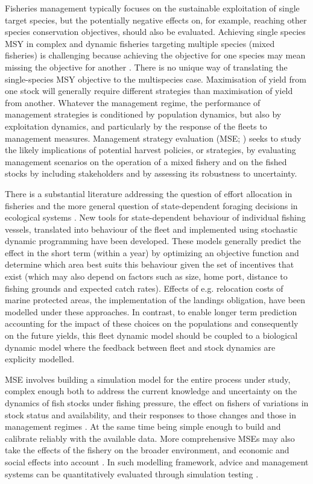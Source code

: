 \documentclass[12pt,oneline,a4paper,numbib]{ouparticle}
\numberwithin{equation}{subsection} %
\begin{document}
Fisheries management typically focuses on the sustainable exploitation of single target species, but the potentially negative effects on, for example, reaching other species conservation objectives, should also be evaluated. Achieving single species MSY in complex and dynamic fisheries targeting multiple species (mixed fisheries) is challenging because achieving the objective for one species may mean missing the objective for another \cite{Ulrich2017}. There is no unique way of translating the single-species MSY objective to the multispecies case. Maximisation of yield from one stock will generally require different strategies than maximisation of yield from another.  Whatever the management regime, the performance of management strategies is conditioned by population dynamics, but also by exploitation dynamics, and particularly by the response of the fleets to management measures. Management strategy evaluation (MSE; \cite{Sainsbury2000, Smith1994, Venables2009}) seeks to study the likely implications of potential harvest policies, or strategies, by evaluating management scenarios on the operation of a mixed fishery and on the fished stocks by including stakeholders and by assessing its robustness to uncertainty. 

There is a substantial literature addressing the question of effort allocation in fisheries and the more general question of state-dependent foraging decisions in ecological systems \cite{ClarkandMangel2000,Houston1999}. New tools for state-dependent behaviour of individual fishing vessels, translated into behaviour of the fleet and implemented using stochastic dynamic programming \cite{Alzorriz2018,Batsleer2015, Dowling2011, Poos2010} have been developed. These models generally predict the effect in the short term (within a year) by optimizing an objective function and determine which area best suits this behaviour given the set of incentives that exist (which may also depend on factors such as size, home port, distance to fishing grounds and expected catch rates). Effects of e.g. relocation costs of marine protected areas, the implementation of the landings obligation, have been modelled under these approaches. In contrast, to enable longer term prediction accounting for the impact of these choices on the populations and consequently on the future yields, this fleet dynamic model should be coupled to a biological dynamic model where the feedback between fleet and stock dynamics are explicity modelled.

MSE involves building a simulation model for the entire process under study, complex enough both to address the current knowledge and uncertainty on the dynamics of fish stocks under fishing pressure, the effect on fishers of variations in stock status and availability, and their responses to those changes and those in management regimes \cite{Venables2009}. At the same time being simple enough to build and calibrate reliably with the available data. More comprehensive MSEs may also take the effects of the fishery on the broader environment, and economic and social effects into account \cite{Dichmont2008, Fulton2007}. In such modelling framework, advice and management systems can be quantitatively evaluated through simulation testing \cite{Dichmont2013, Kell2007}. 
\end{document}
